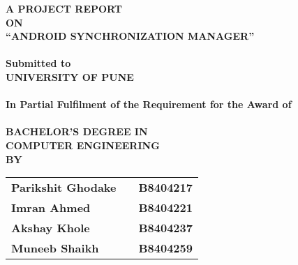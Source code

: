 
\newpage


\begin{center}
\thispagestyle{empty}


\Large{\textbf{A PROJECT REPORT\\ \large{ON}}}\\[0.7cm]
\LARGE{\textsc {\textbf{``ANDROID SYNCHRONIZATION MANAGER''}}}\\[0.5cm]
\vspace{0.5cm}
\Large{\textbf{\\Submitted to}}
\LARGE{\textbf{\\UNIVERSITY OF PUNE\\}}
\vspace{1cm}
\Large{\textbf{\\In Partial Fulfilment of the Requirement for the Award of\\}}
\Large{\textbf{\\BACHELOR'S DEGREE IN\\COMPUTER ENGINEERING}}
\vspace{1cm}
\Large{\textbf{\\BY}}\\[0.5cm]
\begin{table}[h]
\centering
\Large{
\begin{tabular}{>{\bfseries}lc>{\bfseries}r}
Parikshit Ghodake & & B8404217\\Imran Ahmed & & B8404221\\Akshay Khole & & B8404237\\Muneeb Shaikh & & B8404259\\
\end{tabular}}
\end{table}




\end{center}
